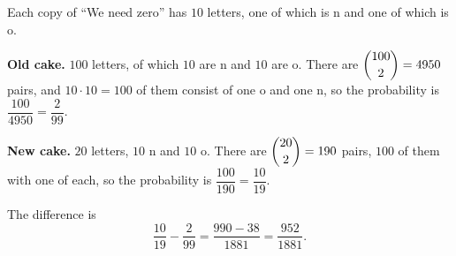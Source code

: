 Each copy of ``We need zero'' has $10$ letters, one of which is n and one of which is o.

\textbf{Old cake.} $100$ letters, of which $10$ are n and $10$ are o. There are $\dbinom{100}{2}=4950$ pairs, and $10\cdot10=100$ of them consist of one o and one n, so the probability is $\dfrac{100}{4950}=\dfrac{2}{99}$.

\textbf{New cake.} $20$ letters, $10$ n and $10$ o. There are $\dbinom{20}{2}=190$ pairs, $100$ of them with one of each, so the probability is $\dfrac{100}{190}=\dfrac{10}{19}$.

The difference is
\[\dfrac{10}{19}-\dfrac{2}{99}=\dfrac{990-38}{1881}=\boxed{\dfrac{952}{1881}}.\]
